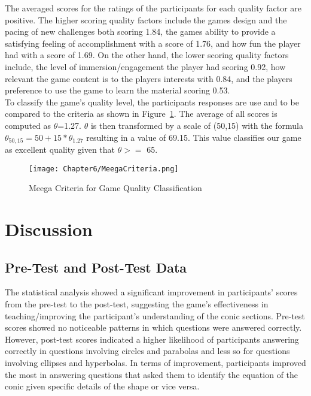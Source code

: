 The averaged scores for the ratings of the participants for each quality factor are positive. The higher scoring quality factors include the games design and the pacing of new challenges both scoring 1.84, the games ability to provide a satisfying feeling of accomplishment with a score of 1.76, and how fun the player had with a score of 1.69. On the other hand, the lower scoring quality factors include, the level of immersion/engagement the player had scoring 0.92, how relevant the game content is to the players interests with 0.84, and the players preference to use the game to learn the material scoring 0.53. \\

To classify the game's quality level, the participants responses are use and to be compared to the criteria as shown in Figure~\ref{fig:MeegaCriteria}. The average of all scores is computed as $\theta$=1.27. $\theta$ is then transformed by a scale of (50,15) with the formula $\theta_{50,15}=50+15* \theta_{1.27}$ resulting in a value of 69.15. This value classifies our game as excellent quality given that $\theta >=$ 65.

\begin{figure}[h]
\hspace*{-1cm}
   \centering                  
   \texttt{[image: Chapter6/MeegaCriteria.png]}      
   \caption{Meega Criteria for Game Quality Classification}
    \label{fig:MeegaCriteria}
\end{figure}
\section{Discussion}

\subsection{Pre-Test and Post-Test Data}
The statistical analysis showed a significant improvement in participants' scores from the pre-test to the post-test, suggesting the game's effectiveness in teaching/improving the participant's understanding of the conic sections. Pre-test scores showed no noticeable patterns in which questions were answered correctly. However, post-test scores indicated a higher likelihood of participants answering correctly in questions involving circles and parabolas and less so for questions involving ellipses and hyperbolas. In terms of improvement, participants improved the most in answering questions that asked them to identify the equation of the conic given specific details of the shape or vice versa.



